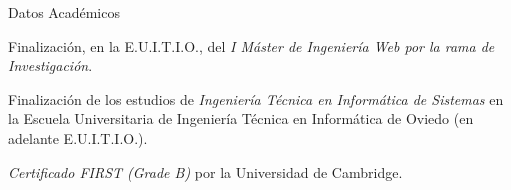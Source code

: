 
\begin{rubric}{Datos Académicos}

  \entry*[2008]
  Finalización, en la E.U.I.T.I.O., del \emph{I Máster de Ingeniería Web por la rama de Investigación}.

  \entry*[2006]
  Finalización de los estudios de \emph{Ingeniería Técnica en Informática de Sistemas} en la Escuela Universitaria de Ingeniería Técnica en Informática de Oviedo (en adelante E.U.I.T.I.O.).

  \entry*[2005]
  \emph{Certificado FIRST (Grade B)} por la Universidad de Cambridge.

\end{rubric}


